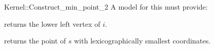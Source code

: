 \begin{ccRefFunctionObjectConcept}{Kernel::Construct_min_point_2}
A model for this must provide:


       {returns the lower left vertex of $i$.}

       {returns the point of $s$ with lexicographically smallest coordinates.}

\end{ccRefFunctionObjectConcept}
